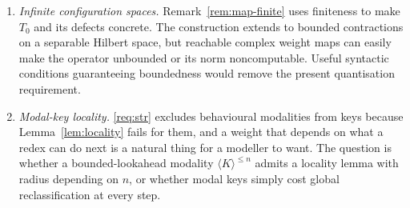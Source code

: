 \documentclass[11pt,a4paper]{article}
\theoremstyle{plain}
\theoremstyle{definition}
\theoremstyle{remark}
\newcommand{\Rnn}{\mathbb{R}_{\geq 0}}
\newcommand{\Cx}{\mathbb{C}}
\begin{document}
\begin{enumerate}[leftmargin=2.2em]
develops the flat-substitution instance independently. The criterion is no longer the existence of a
map into $\Rnn$: the real and complex cases already have different operational readings. The open
question is instead which algebraic structure turns a weighted coalgebra into an executable object
and what replaces unitary dilation outside $\Cx$.
\item \emph{Infinite configuration spaces.} Remark~\ref{rem:map-finite} uses finiteness to make
$T_0$ and its defects concrete. The construction extends to bounded contractions on a separable
Hilbert space, but reachable complex weight maps can easily make the operator unbounded or its norm
noncomputable. Useful syntactic conditions guaranteeing boundedness would remove the present
quantisation requirement.
\item \emph{Modal-key locality.} \ref{req:str} excludes behavioural modalities from keys because
Lemma~\ref{lem:locality} fails for them, and a weight that depends on what a redex can do next is a
natural thing for a modeller to want. The question is whether a bounded-lookahead modality
$\langle K\rangle^{\le n}$ admits a locality lemma with radius depending on $n$, or whether modal
keys simply cost global reclassification at every step.
\end{enumerate}
\end{document}
